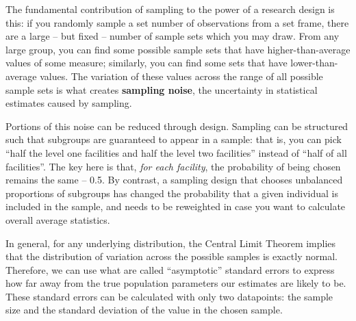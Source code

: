 The fundamental contribution of sampling to the power of a research design is this:
if you randomly sample a set number of observations from a set frame,
there are a large -- but fixed -- number of sample sets which you may draw.
From any large group, you can find some possible sample sets
that have higher-than-average values of some measure;
similarly, you can find some sets that have lower-than-average values.
The variation of these values across the range of all possible sample sets is what creates
\textbf{sampling noise}, the uncertainty in statistical estimates caused by sampling.

Portions of this noise can be reduced through design.
Sampling can be structured such that subgroups are guaranteed to appear in a sample:
that is, you can pick ``half the level one facilities and half the level two facilities'' instead of
``half of all facilities''. The key here is that, \textit{for each facility},
the probability of being chosen remains the same -- 0.5.
By contrast, a sampling design that chooses unbalanced proportions of subgroups
has changed the probability that a given individual is included in the sample,
and needs to be reweighted in case you want to calculate overall average statistics.

In general, for any underlying distribution, the Central Limit Theorem implies that
the distribution of variation across the possible samples is exactly normal.
Therefore, we can use what are called ``asymptotic'' standard errors
to express how far away from the true population parameters our estimates are likely to be.
These standard errors can be calculated with only two datapoints:
the sample size and the standard deviation of the value in the chosen sample.


